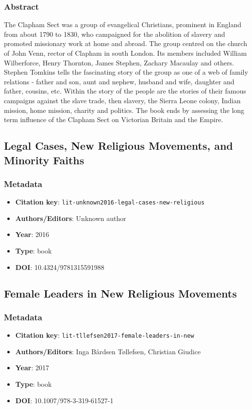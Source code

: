 \subsubsection*{Abstract}
The Clapham Sect was a group of evangelical Christians, prominent in England from about 1790 to 1830, who campaigned for the abolition of slavery and promoted missionary work at home and abroad. The group centred on the church of John Venn, rector of Clapham in south London. Its members included William Wilberforce, Henry Thornton, James Stephen, Zachary Macaulay and others. Stephen Tomkins tells the fascinating story of the group as one of a web of family relations - father and son, aunt and nephew, husband and wife, daughter and father, cousins, etc. Within the story of the people are the stories of their famous campaigns against the slave trade, then slavery, the Sierra Leone colony, Indian mission, home mission, charity and politics. The book ends by assessing the long term influence of the Clapham Sect on Victorian Britain and the Empire.

\subsection{Legal Cases, New Religious Movements, and Minority Faiths}\label{lit:lit-unknown2016-legal-cases-new-religious}
\subsubsection*{Metadata}
\begin{itemize}
  \item \textbf{Citation key}: \texttt{lit-unknown2016-legal-cases-new-religious}
  \item \textbf{Authors/Editors}: Unknown author
  \item \textbf{Year}: 2016
  \item \textbf{Type}: book
  \item \textbf{DOI}: 10.4324/9781315591988
\end{itemize}

\subsection{Female Leaders in New Religious Movements}\label{lit:lit-tllefsen2017-female-leaders-in-new}
\subsubsection*{Metadata}
\begin{itemize}
  \item \textbf{Citation key}: \texttt{lit-tllefsen2017-female-leaders-in-new}
  \item \textbf{Authors/Editors}: Inga Bårdsen Tøllefsen, Christian Giudice
  \item \textbf{Year}: 2017
  \item \textbf{Type}: book
  \item \textbf{DOI}: 10.1007/978-3-319-61527-1
\end{itemize}

